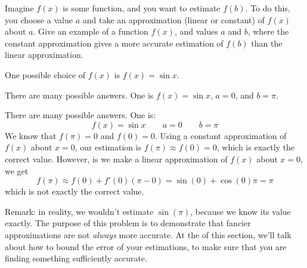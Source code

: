 \begin{question}
Imagine $f(x)$ is some function, and you want to estimate $f(b)$. To do this, you choose a value $a$ and take an approximation (linear or constant) of $f(x)$ about $a$. Give an example of a function $f(x)$, and values $a$ and $b$, where the constant approximation gives a more accurate estimation of $f(b)$ than the linear approximation.
\end{question}
\begin{hint}
One possible choice of $f(x)$ is $f(x)=\sin x$.
\end{hint}
\begin{answer} There are many possible answers. One is $f(x)=\sin x$, $a=0$, and $b=\pi$.
\end{answer}
\begin{solution}
There are many possible answers. One is:
\[f(x)=\sin x \qquad a=0 \qquad b=\pi \]
We know that $f(\pi)=0$ and $f(0)=0$. Using a constant approximation of $f(x)$ about $x=0$, our estimation is $f(\pi)\approx f(0)=0$, which is exactly the correct value. However, is we make a linear approximation of $f(x)$ about $x=0$, we get
\[
f(\pi) \approx f(0)+f'(0)(\pi-0)=\sin(0)+\cos(0)\pi=\pi
\]
which is not exactly the correct value.
\begin{center}\end{center}
Remark: in reality, we wouldn't estimate $\sin(\pi)$, because we know its value exactly. The purpose of this problem is to demonstrate that fancier approximations are not \emph{always} more accurate. At the of this section, we'll talk about how to bound the error of your estimations, to make sure that you are finding something sufficiently accurate.
\end{solution}


